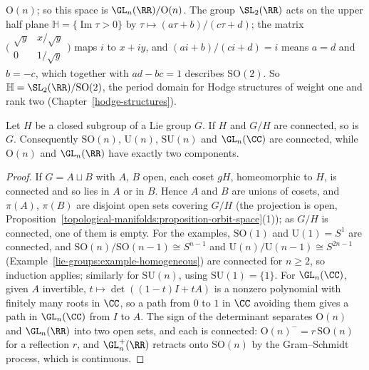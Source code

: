 \begin{example}
\begin{enumerate}
$\mathrm{O}(n)$; so this space is $\GL_n(\RR)/\mathrm{O}(n)$. The group $\SL_2(\RR)$ acts on the upper half plane $\mathbb{H} = \{\operatorname{Im}\tau > 0\}$
by $\tau \mapsto (a\tau + b)/(c\tau + d)$; the matrix $\bigl(\begin{smallmatrix}\sqrt{y} & x/\sqrt{y}\\ 0 & 1/\sqrt{y}\end{smallmatrix}\bigr)$ maps $i$ to
$x + iy$, and $(ai + b)/(ci + d) = i$ means $a = d$ and $b = -c$, which together with $ad - bc = 1$ describes $\mathrm{SO}(2)$. So
$\mathbb{H} = \SL_2(\RR)/\mathrm{SO}(2)$, the period domain for Hodge structures of weight one and rank two (Chapter~\ref{hodge-structures}).
\end{enumerate}
\end{example}

\begin{proposition}\label{lie-groups:proposition-connectedness}
Let $H$ be a closed subgroup of a Lie group $G$. If $H$ and $G/H$ are connected, so is $G$. Consequently $\mathrm{SO}(n)$, $\mathrm{U}(n)$, $\mathrm{SU}(n)$ and $\GL_n(\CC)$ are connected, while $\mathrm{O}(n)$ and $\GL_n(\RR)$ have
exactly two components.
\end{proposition}

\begin{proof}
If $G = A \sqcup B$ with $A$, $B$ open, each coset $gH$, homeomorphic to $H$, is connected and so lies in $A$ or in $B$. Hence $A$ and $B$ are unions of cosets, and $\pi(A)$, $\pi(B)$ are disjoint open sets covering $G/H$ (the projection is open,
Proposition~\ref{topological-manifolds:proposition-orbit-space}(1)); as $G/H$ is connected, one of them is empty. For the examples, $\mathrm{SO}(1)$ and $\mathrm{U}(1) = S^1$ are connected, and
$\mathrm{SO}(n)/\mathrm{SO}(n-1) \cong S^{n-1}$ and $\mathrm{U}(n)/\mathrm{U}(n-1) \cong S^{2n-1}$ (Example~\ref{lie-groups:example-homogeneous}) are connected for $n \geq 2$, so induction applies; similarly for $\mathrm{SU}(n)$, using
$\mathrm{SU}(1) = \{1\}$. For $\GL_n(\CC)$, given $A$ invertible, $t \mapsto \det((1 - t)I + tA)$ is a nonzero polynomial with finitely many roots in $\CC$, so a path from $0$ to $1$ in $\CC$ avoiding them gives a path in $\GL_n(\CC)$ from $I$ to $A$.
The sign of the determinant separates $\mathrm{O}(n)$ and $\GL_n(\RR)$ into two open sets, and each is connected: $\mathrm{O}(n)^- = r\,\mathrm{SO}(n)$ for a reflection $r$, and $\GL^+_n(\RR)$ retracts onto $\mathrm{SO}(n)$ by the Gram--Schmidt process,
which is continuous.
\end{proof}

